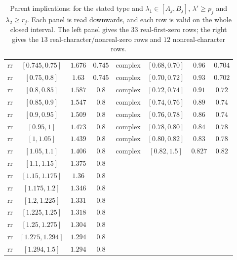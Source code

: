 \begin{table}[tp]
\begin{tabular}{@{}lccc@{\qquad\qquad}lccc@{}}
$\mathrm{rr}$ & $[0.745,0.75]$ & $1.676$ & $0.745$ & $\mathrm{complex}$ & $[0.68,0.70]$ & $0.96$ & $0.704$ \\
$\mathrm{rr}$ & $[0.75,0.8]$ & $1.63$ & $0.745$ & $\mathrm{complex}$ & $[0.70,0.72]$ & $0.93$ & $0.702$ \\
$\mathrm{rr}$ & $[0.8,0.85]$ & $1.587$ & $0.8$ & $\mathrm{complex}$ & $[0.72,0.74]$ & $0.91$ & $0.72$ \\
$\mathrm{rr}$ & $[0.85,0.9]$ & $1.547$ & $0.8$ & $\mathrm{complex}$ & $[0.74,0.76]$ & $0.89$ & $0.74$ \\
$\mathrm{rr}$ & $[0.9,0.95]$ & $1.509$ & $0.8$ & $\mathrm{complex}$ & $[0.76,0.78]$ & $0.86$ & $0.74$ \\
$\mathrm{rr}$ & $[0.95,1]$ & $1.473$ & $0.8$ & $\mathrm{complex}$ & $[0.78,0.80]$ & $0.84$ & $0.78$ \\
$\mathrm{rr}$ & $[1,1.05]$ & $1.439$ & $0.8$ & $\mathrm{complex}$ & $[0.80,0.82]$ & $0.83$ & $0.78$ \\
$\mathrm{rr}$ & $[1.05,1.1]$ & $1.406$ & $0.8$ & $\mathrm{complex}$ & $[0.82,1.5]$ & $0.827$ & $0.82$ \\
$\mathrm{rr}$ & $[1.1,1.15]$ & $1.375$ & $0.8$ &  & & &  \\
$\mathrm{rr}$ & $[1.15,1.175]$ & $1.36$ & $0.8$ &  & & &  \\
$\mathrm{rr}$ & $[1.175,1.2]$ & $1.346$ & $0.8$ &  & & &  \\
$\mathrm{rr}$ & $[1.2,1.225]$ & $1.331$ & $0.8$ &  & & &  \\
$\mathrm{rr}$ & $[1.225,1.25]$ & $1.318$ & $0.8$ &  & & &  \\
$\mathrm{rr}$ & $[1.25,1.275]$ & $1.304$ & $0.8$ &  & & &  \\
$\mathrm{rr}$ & $[1.275,1.294]$ & $1.294$ & $0.8$ &  & & &  \\
$\mathrm{rr}$ & $[1.294,1.5]$ & $1.294$ & $0.8$ &  & & &  \\
\bottomrule
\end{tabular}
\caption{Parent implications: for the stated type and $\lambda_1\in[A_j,B_j]$,
$\lambda'\ge p_j$ and $\lambda_2\ge r_j$. Each panel is read downwards, and each row is
valid on the whole closed interval. The left panel gives the $33$ real-first-zero rows;
the right gives the $13$ real-character/nonreal-zero rows and $12$ nonreal-character rows.}
\label{tab:parents}
\end{table}

